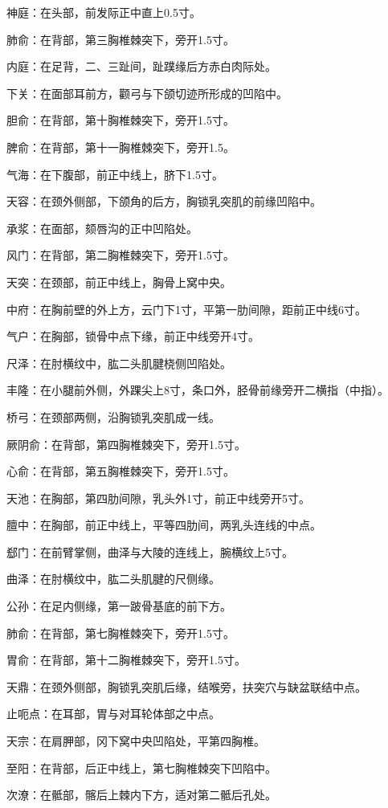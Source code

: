 \documentclass[12pt,UTF8,openany]{ctexbook}
\begin{document}
神庭：在头部，前发际正中直上0.5寸。

肺俞：在背部，第三胸椎棘突下，旁开1.5寸。

内庭：在足背，二、三趾间，趾蹼缘后方赤白肉际处。

下关：在面部耳前方，颧弓与下颌切迹所形成的凹陷中。

胆俞：在背部，第十胸椎棘突下，旁开1.5寸。

脾俞：在背部，第十一胸椎棘突下，旁开1.5。

气海：在下腹部，前正中线上，脐下1.5寸。

天容：在颈外侧部，下颌角的后方，胸锁乳突肌的前缘凹陷中。

承浆：在面部，颏唇沟的正中凹陷处。

风门：在背部，第二胸椎棘突下，旁开1.5寸。

天突：在颈部，前正中线上，胸骨上窝中央。

中府：在胸前壁的外上方，云门下1寸，平第一肋间隙，距前正中线6寸。

气户：在胸部，锁骨中点下缘，前正中线旁开4寸。

尺泽：在肘横纹中，肱二头肌腱桡侧凹陷处。

丰隆：在小腿前外侧，外踝尖上8寸，条口外，胫骨前缘旁开二横指（中指）。

桥弓：在颈部两侧，沿胸锁乳突肌成一线。

厥阴俞：在背部，第四胸椎棘突下，旁开1.5寸。

心俞：在背部，第五胸椎棘突下，旁开1.5寸。

天池：在胸部，第四肋间隙，乳头外1寸，前正中线旁开5寸。

膻中：在胸部，前正中线上，平等四肋间，两乳头连线的中点。

郄门：在前臂掌侧，曲泽与大陵的连线上，腕横纹上5寸。

曲泽：在肘横纹中，肱二头肌腱的尺侧缘。

公孙：在足内侧缘，第一跛骨基底的前下方。

肺俞：在背部，第七胸椎棘突下，旁开1.5寸。

胃俞：在背部，第十二胸椎棘突下，旁开1.5寸。

天鼎：在颈外侧部，胸锁乳突肌后缘，结喉旁，扶突穴与缺盆联结中点。

止呃点：在耳部，胃与对耳轮体部之中点。

天宗：在肩胛部，冈下窝中央凹陷处，平第四胸椎。

至阳：在背部，后正中线上，第七胸椎棘突下凹陷中。

次潦：在骶部，髂后上棘内下方，适对第二骶后孔处。
\end{document}
